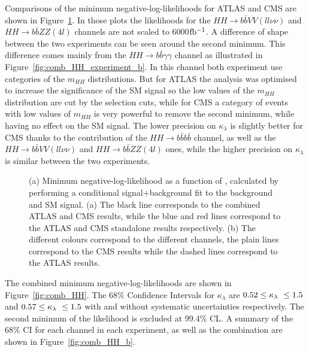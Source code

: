 Comparisons of the minimum negative-log-likelihoods for ATLAS and CMS are shown in Figure~\ref{fig:comb_HH_experiment}. In those plots the likelihoods for the $HH \rightarrow b\bar{b}VV(ll\nu\nu)$ and $HH \rightarrow b\bar{b}ZZ(4l)$ channels are not scaled to 6000$\mbox{fb$^{-1}$}$.
A difference of shape between the two experiments can be seen around the second minimum. This difference comes mainly from the $HH \rightarrow b\bar{b}\gamma\gamma$ channel as illustrated in Figure~\ref{fig:comb_HH_experiment_b}. In this channel both experiment use categories of the $m_{HH}$ distributions. But for ATLAS the analysis was optimised to increase the significance of the SM signal so the low values of the $m_{HH}$ distribution are cut by the selection cuts, while for CMS a category of events with low values of $m_{HH}$ is very powerful to remove the second minimum, while having no effect on the SM signal.
The lower precision on $\kappa_{\lambda}$ is slightly better for CMS thanks to the contribution of the $HH \rightarrow b\bar{b}b\bar{b}$ channel, as well as the $HH \rightarrow b\bar{b}VV(ll\nu\nu)$ and $HH \rightarrow b\bar{b}ZZ(4l)$ ones, while the higher precision on $\kappa_{\lambda}$ is similar between the two experiments.

\begin{figure}[!htb]
\centering 
{} 
\caption{(a) Minimum negative-log-likelihood as a function of \kl, calculated by performing a conditional signal+background fit to the background and SM signal. (a) The black line corresponds to the combined ATLAS and CMS results, while the blue and red lines correspond to the ATLAS and CMS standalone results respectively. (b) The different colours correspond to the different channels, the plain lines correspond to the CMS results while the dashed lines correspond to the ATLAS results.} 
\label{fig:comb_HH_experiment} 
\end{figure}

The combined minimum negative-log-likelihoods are shown in Figure~\ref{fig:comb_HH}. 
The 68\% Confidence Intervals for $\kappa_{\lambda}$ are $0.52 \leq \kappa_{\lambda}\ \leq 1.5$ and $0.57 \leq \kappa_{\lambda}\ \leq 1.5$ with and without systematic uncertainties respectively. The second minimum of the likelihood is excluded at 99.4\% CL. A summary of the 68\% CI for each channel in each experiment, as well as the combination are shown in Figure~\ref{fig:comb_HH_b}.

